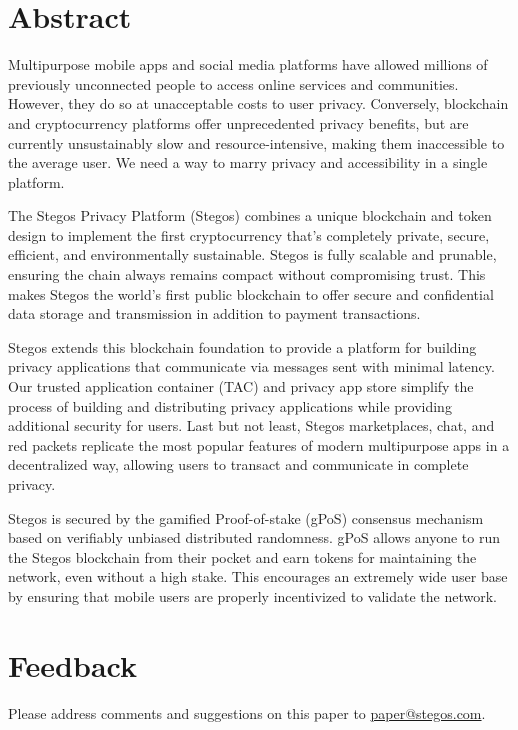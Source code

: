\documentclass[8pt,fleqn,openany]{book}
\begin{document}
\newpage

\tableofcontents\newpage

\section{Abstract}
Multipurpose mobile apps and social media platforms have allowed millions of previously unconnected people to access online services and communities. However, they do so at unacceptable costs to user privacy. Conversely, blockchain and cryptocurrency platforms offer unprecedented privacy benefits, but are currently unsustainably slow and resource-intensive, making them inaccessible to the average user. We need a way to marry privacy and accessibility in a single platform.

The Stegos Privacy Platform (Stegos) combines a unique blockchain and token design to implement the first cryptocurrency that’s completely private, secure, efficient, and environmentally sustainable. Stegos is fully scalable and prunable, ensuring the chain always remains compact without compromising trust. This makes Stegos the world’s first public blockchain to offer secure and confidential data storage and transmission in addition to payment transactions. 

Stegos extends this blockchain foundation to provide a platform for building privacy applications that communicate via messages sent with minimal latency. Our trusted application container (TAC) and privacy app store simplify the process of building and distributing privacy applications while providing additional security for users. Last but not least, Stegos marketplaces, chat, and red packets replicate the most popular features of modern multipurpose apps in a decentralized way, allowing users to transact and communicate in complete privacy.

Stegos is secured by the gamified Proof-of-stake (gPoS) consensus mechanism based on verifiably unbiased distributed randomness. gPoS allows anyone to run the Stegos blockchain from their pocket and earn tokens for maintaining the network, even without a high stake. This encourages an extremely wide user base by ensuring that mobile users are properly incentivized to validate the network.
\section{Feedback}

Please address comments and suggestions on this paper to \href{mailto:paper@stegos.com}{paper@stegos.com}.
\end{document}
